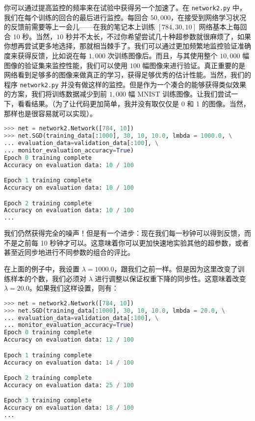 你可以通过提高监控的频率来在试验中获得另一个加速了。在 \lstinline!network2.py! 中，我们在每个训练的回合的最后进行监控。每回合 $50,000$，在接受到网络学习状况的反馈前需要等上一会儿——在我的笔记本上训练 $[784, 30, 10]$ 网络基本上每回合 $10$ 秒。当然，$10$ 秒并不太长，不过你希望尝试几十种超参数就很麻烦了，如果你想再尝试更多地选择，那就相当棘手了。我们可以通过更加频繁地监控验证准确度来获得反馈，比如说在每 $1,000$ 次训练图像后。而且，与其使用整个 $10,000$ 幅图像的验证集来监控性能，我们可以使用 $100$ 幅图像来进行验证。真正重要的是网络看到足够多的图像来做真正的学习，获得足够优秀的估计性能。当然，我们的程序 \lstinline!network2.py! 并没有做这样的监控。但是作为一个凑合的能够获得类似效果的方案，我们将训练数据减少到前 $1,000$ 幅 MNIST 训练图像。让我们尝试一下，看看结果。（为了让代码更加简单，我并没有取仅仅是 0 和 1 的图像。当然，那样也是很容易就可以实现）。
\begin{lstlisting}[language=Python]
>>> net = network2.Network([784, 10])
>>> net.SGD(training_data[:1000], 30, 10, 10.0, lmbda = 1000.0, \
... evaluation_data=validation_data[:100], \
... monitor_evaluation_accuracy=True)
Epoch 0 training complete
Accuracy on evaluation data: 10 / 100

Epoch 1 training complete
Accuracy on evaluation data: 10 / 100

Epoch 2 training complete
Accuracy on evaluation data: 10 / 100
...
\end{lstlisting}

我们仍然获得完全的噪声！但是有一个进步：现在我们每一秒钟可以得到反馈，而不是之前每 10 秒钟才可以。这意味着你可以更加快速地实验其他的超参数，或者甚至近同步地进行不同参数的组合的评比。

在上面的例子中，我设置 $\lambda=1000.0$，跟我们之前一样。但是因为这里改变了训练样本的个数，我们必须对 $\lambda$ 进行调整以保证权重下降的同步性。这意味着改变 $\lambda = 20.0$。如果我们这样设置，则有：

\begin{lstlisting}[language=Python]
>>> net = network2.Network([784, 10])
>>> net.SGD(training_data[:1000], 30, 10, 10.0, lmbda = 20.0, \
... evaluation_data=validation_data[:100], \
... monitor_evaluation_accuracy=True)
Epoch 0 training complete
Accuracy on evaluation data: 12 / 100

Epoch 1 training complete
Accuracy on evaluation data: 14 / 100

Epoch 2 training complete
Accuracy on evaluation data: 25 / 100

Epoch 3 training complete
Accuracy on evaluation data: 18 / 100
...
\end{lstlisting}

